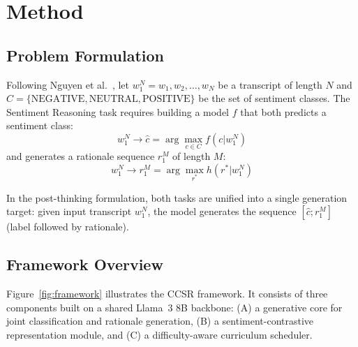 \documentclass[conference]{IEEEtran}
\begin{document}
\section{Method}

\subsection{Problem Formulation}

Following Nguyen et al.~\cite{nguyen2024sentiment}, let $w_1^N = w_1, w_2, \ldots, w_N$ be a transcript of length $N$ and $C = \{\text{NEGATIVE}, \text{NEUTRAL}, \text{POSITIVE}\}$ be the set of sentiment classes. The Sentiment Reasoning task requires building a model $f$ that both predicts a sentiment class:
\begin{equation}
    w_1^N \rightarrow \hat{c} = \arg\max_{c \in C} f(c | w_1^N)
\end{equation}
and generates a rationale sequence $r_1^M$ of length $M$:
\begin{equation}
    w_1^N \rightarrow r_1^M = \arg\max_{r^*} h(r^* | w_1^N)
\end{equation}

In the post-thinking formulation, both tasks are unified into a single generation target: given input transcript $w_1^N$, the model generates the sequence $[\hat{c}; r_1^M]$ (label followed by rationale).

\subsection{Framework Overview}

Figure~\ref{fig:framework} illustrates the CCSR framework. It consists of three components built on a shared Llama~3 8B backbone: (A) a generative core for joint classification and rationale generation, (B) a sentiment-contrastive representation module, and (C) a difficulty-aware curriculum scheduler.
\end{document}
